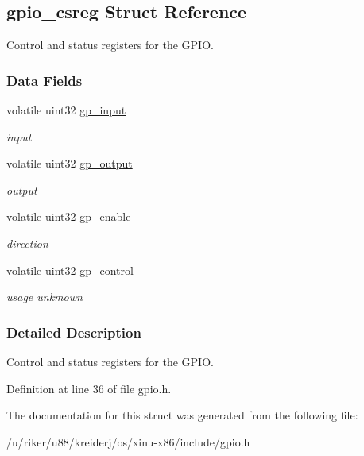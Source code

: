 \hypertarget{structgpio__csreg}{}\subsection{gpio\+\_\+csreg Struct Reference}
\label{structgpio__csreg}


Control and status registers for the G\+P\+IO.  


\subsubsection*{Data Fields}
\begin{DoxyCompactItemize}
\item 
\mbox{\label{structgpio__csreg_a36bad31eeea9638105f4a67d72ea443e}} 
volatile uint32 \hyperlink{structgpio__csreg_a36bad31eeea9638105f4a67d72ea443e}{gp\+\_\+input}
\begin{DoxyCompactList}\small\item\em input \end{DoxyCompactList}\item 
\mbox{\label{structgpio__csreg_a5273a0e066bc98f3b2d1b9d0416f8095}} 
volatile uint32 \hyperlink{structgpio__csreg_a5273a0e066bc98f3b2d1b9d0416f8095}{gp\+\_\+output}
\begin{DoxyCompactList}\small\item\em output \end{DoxyCompactList}\item 
\mbox{\label{structgpio__csreg_a8606e7245bbb70f1cd693f13be05de03}} 
volatile uint32 \hyperlink{structgpio__csreg_a8606e7245bbb70f1cd693f13be05de03}{gp\+\_\+enable}
\begin{DoxyCompactList}\small\item\em direction \end{DoxyCompactList}\item 
\mbox{\label{structgpio__csreg_a724d891bb19e060021732cd7ecb52cea}} 
volatile uint32 \hyperlink{structgpio__csreg_a724d891bb19e060021732cd7ecb52cea}{gp\+\_\+control}
\begin{DoxyCompactList}\small\item\em usage unkmown \end{DoxyCompactList}\end{DoxyCompactItemize}


\subsubsection{Detailed Description}
Control and status registers for the G\+P\+IO. 

Definition at line 36 of file gpio.\+h.



The documentation for this struct was generated from the following file\+:\begin{DoxyCompactItemize}
\item 
/u/riker/u88/kreiderj/os/xinu-\/x86/include/gpio.\+h\end{DoxyCompactItemize}
